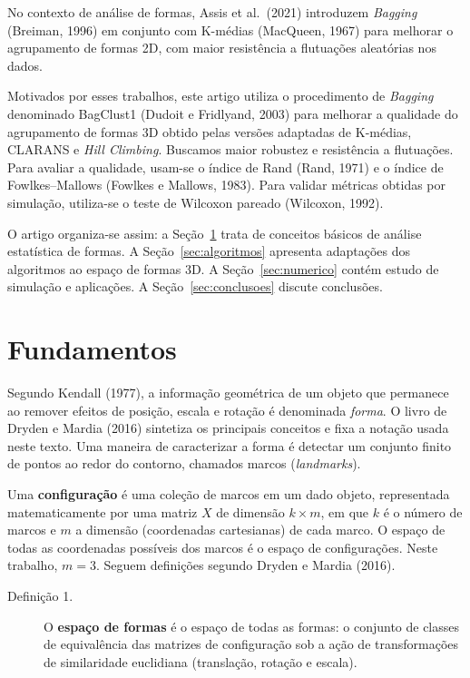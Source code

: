 \documentclass[11pt,a4paper]{article}
\begin{document}
No contexto de análise de formas, Assis et al.\ (2021) introduzem \emph{Bagging} (Breiman, 1996) em conjunto com K-médias (MacQueen, 1967) para melhorar o agrupamento de formas 2D, com maior resistência a flutuações aleatórias nos dados.

Motivados por esses trabalhos, este artigo utiliza o procedimento de \emph{Bagging} denominado BagClust1 (Dudoit e Fridlyand, 2003) para melhorar a qualidade do agrupamento de formas 3D obtido pelas versões adaptadas de K-médias, CLARANS e \emph{Hill Climbing}. Buscamos maior robustez e resistência a flutuações. Para avaliar a qualidade, usam-se o índice de Rand (Rand, 1971) e o índice de Fowlkes--Mallows (Fowlkes e Mallows, 1983). Para validar métricas obtidas por simulação, utiliza-se o teste de Wilcoxon pareado (Wilcoxon, 1992).

O artigo organiza-se assim: a Seção~\ref{sec:fundamentos} trata de conceitos básicos de análise estatística de formas. A Seção~\ref{sec:algoritmos} apresenta adaptações dos algoritmos ao espaço de formas 3D. A Seção~\ref{sec:numerico} contém estudo de simulação e aplicações. A Seção~\ref{sec:conclusoes} discute conclusões.

\section{Fundamentos}\label{sec:fundamentos}

Segundo Kendall (1977), a informação geométrica de um objeto que permanece ao remover efeitos de posição, escala e rotação é denominada \emph{forma}. O livro de Dryden e Mardia (2016) sintetiza os principais conceitos e fixa a notação usada neste texto. Uma maneira de caracterizar a forma é detectar um conjunto finito de pontos ao redor do contorno, chamados marcos (\emph{landmarks}).

Uma \textbf{configuração} é uma coleção de marcos em um dado objeto, representada matematicamente por uma matriz $X$ de dimensão $k \times m$, em que $k$ é o número de marcos e $m$ a dimensão (coordenadas cartesianas) de cada marco. O espaço de todas as coordenadas possíveis dos marcos é o espaço de configurações. Neste trabalho, $m=3$. Seguem definições segundo Dryden e Mardia (2016).

\begin{description}
  \item[Definição 1.] O \textbf{espaço de formas} é o espaço de todas as formas: o conjunto de classes de equivalência das matrizes de configuração sob a ação de transformações de similaridade euclidiana (translação, rotação e escala).
\end{description}
\end{document}

